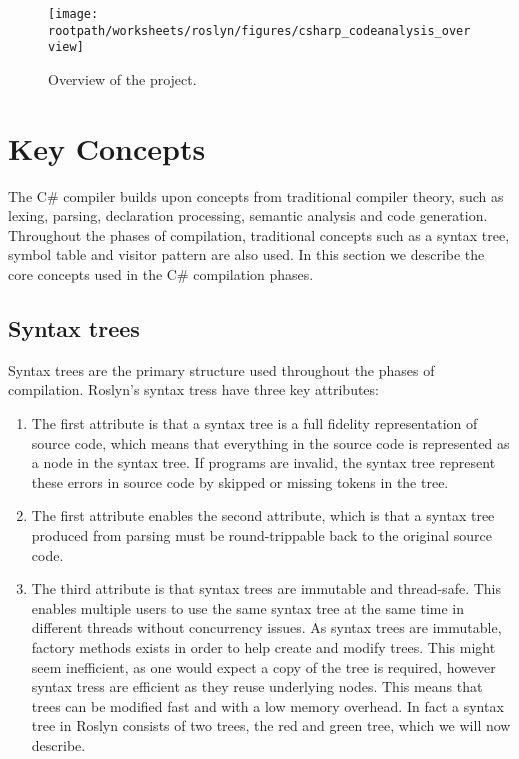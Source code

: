 \begin{figure}[htbp]
\centering
 \texttt{[image: \\rootpath/worksheets/roslyn/figures/csharp\_codeanalysis\_overview]} 
 \caption{Overview of the  project.}
\label{fig:roslyn_csharpanalysis_overview}
\end{figure}

\section{Key Concepts}
The C\# compiler builds upon concepts from traditional compiler theory, such as lexing, parsing, declaration processing, semantic analysis and code generation\cite{sebestaProLang}\cite{fischer2009crafting}. Throughout the phases of compilation, traditional concepts such as a syntax tree, symbol table and visitor pattern are also used. In this section we describe the core concepts used in the C\# compilation phases.

\subsection{Syntax trees}\label{sec:syntax_trees}
Syntax trees are the primary structure used throughout the phases of compilation. Roslyn's syntax tress have three key attributes\cite[p. 6]{ng2012roslyn}: 
\begin{enumerate}
	\item The first attribute is that a syntax tree is a full fidelity representation of source code, which means that everything in the source code is represented as a node in the syntax tree. If programs are invalid, the syntax tree represent these errors in source code by skipped or missing tokens in the tree. 
	\item The first attribute enables the second attribute, which is that a syntax tree produced from parsing must be round-trippable back to the original source code.
	\item The third attribute is that syntax trees are immutable and thread-safe. This enables multiple users to use the same syntax tree at the same time in different threads without concurrency issues. As syntax trees are immutable, factory methods exists in order to help create and modify trees. This might seem inefficient, as one would expect a copy of the tree is required, however syntax tress are efficient as they reuse underlying nodes. This means that trees can be modified fast and with a low memory overhead. In fact a syntax tree in Roslyn consists of two trees, the red and green tree, which we will now describe.
\end{enumerate}

